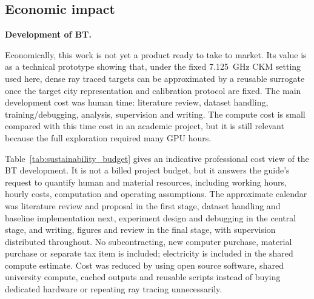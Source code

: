 \subsection{Economic impact}

\textbf{Development of BT.}

Economically, this work is not yet a product ready to take to market. Its value
is as a technical prototype showing that, under the fixed \SI{7.125}{GHz} CKM
setting used here, dense ray traced targets can be approximated by a reusable
surrogate once the target city representation and calibration protocol are fixed.
The main development cost was human time:
literature review, dataset handling, training/debugging, analysis, supervision
and writing. The compute cost is small compared with this time cost in an
academic project, but it is still relevant because the full exploration
required many GPU hours.

Table~\ref{tab:sustainability_budget} gives an indicative professional cost
view of the BT development. It is not a billed project budget, but it answers
the guide's request to quantify human and material resources, including working
hours, hourly costs, computation and operating assumptions.
The approximate calendar was literature review and proposal in the first stage,
dataset handling and baseline implementation next, experiment design and
debugging in the central stage, and writing, figures and review in the final
stage, with supervision distributed throughout. No subcontracting, new computer
purchase, material purchase or separate tax item is included; electricity is
included in the shared compute estimate. Cost was reduced by using open source
software, shared university compute, cached outputs and reusable scripts instead
of buying dedicated hardware or repeating ray tracing unnecessarily.

